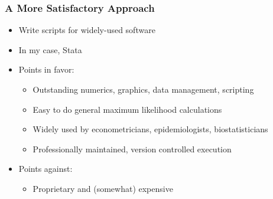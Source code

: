 \begin{frame}
    \frametitle{A More Satisfactory Approach}
	
	\begin{itemize}
		\item Write scripts for widely-used software
		\item In my case, Stata
		\item Points in favor:
		\begin{itemize}
			\item Outstanding numerics, graphics, data management, scripting
			\item Easy to do general maximum likelihood calculations
			\item Widely used by econometricians, epidemiologists, biostatisticians
			\item Professionally maintained, version controlled execution
		\end{itemize}
		\item Points against:
		\begin{itemize}
			\item Proprietary and (somewhat) expensive
		\end{itemize}
	\end{itemize}
\end{frame}
